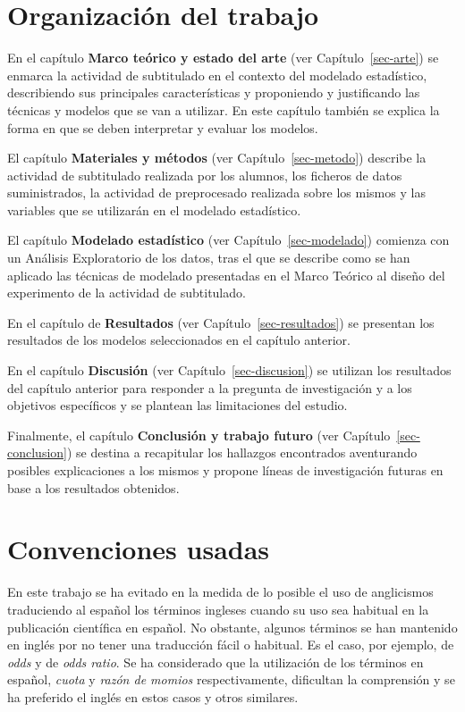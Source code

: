 \documentclass[
  12pt,
  a4paper,
  extrafontsizes,
  onecolumn,
  openright,
  table]{memoir}
\begin{document}
\hypertarget{organizaciuxf3n-del-trabajo}{%
\section{Organización del trabajo}\label{organizaciuxf3n-del-trabajo}}

En el capítulo \textbf{Marco teórico y estado del arte} (ver
Capítulo~\ref{sec-arte}) se enmarca la actividad de subtitulado en el
contexto del modelado estadístico, describiendo sus principales
características y proponiendo y justificando las técnicas y modelos que
se van a utilizar. En este capítulo también se explica la forma en que
se deben interpretar y evaluar los modelos.

El capítulo \textbf{Materiales y métodos} (ver
Capítulo~\ref{sec-metodo}) describe la actividad de subtitulado
realizada por los alumnos, los ficheros de datos suministrados, la
actividad de preprocesado realizada sobre los mismos y las variables que
se utilizarán en el modelado estadístico.

El capítulo \textbf{Modelado estadístico} (ver
Capítulo~\ref{sec-modelado}) comienza con un Análisis Exploratorio de
los datos, tras el que se describe como se han aplicado las técnicas de
modelado presentadas en el Marco Teórico al diseño del experimento de la
actividad de subtitulado.

En el capítulo de \textbf{Resultados} (ver
Capítulo~\ref{sec-resultados}) se presentan los resultados de los
modelos seleccionados en el capítulo anterior.

En el capítulo \textbf{Discusión} (ver Capítulo~\ref{sec-discusion}) se
utilizan los resultados del capítulo anterior para responder a la
pregunta de investigación y a los objetivos específicos y se plantean
las limitaciones del estudio.

Finalmente, el capítulo \textbf{Conclusión y trabajo futuro} (ver
Capítulo~\ref{sec-conclusion}) se destina a recapitular los hallazgos
encontrados aventurando posibles explicaciones a los mismos y propone
líneas de investigación futuras en base a los resultados obtenidos.

\hypertarget{convenciones-usadas}{%
\section{Convenciones usadas}\label{convenciones-usadas}}

En este trabajo se ha evitado en la medida de lo posible el uso de
anglicismos traduciendo al español los términos ingleses cuando su uso
sea habitual en la publicación científica en español. No obstante,
algunos términos se han mantenido en inglés por no tener una traducción
fácil o habitual. Es el caso, por ejemplo, de \emph{odds} y de
\emph{odds ratio}. Se ha considerado que la utilización de los términos
en español, \emph{cuota} y \emph{razón de momios} respectivamente,
dificultan la comprensión y se ha preferido el inglés en estos casos y
otros similares.
\end{document}
